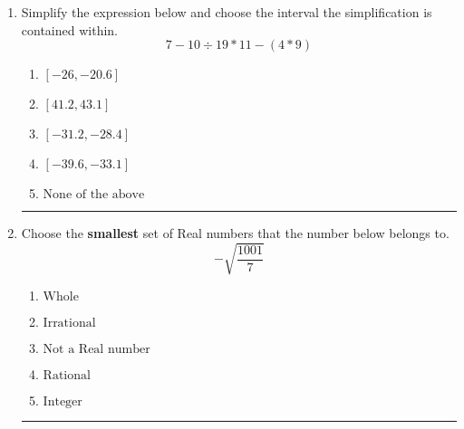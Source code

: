 \documentclass[14pt]{extbook}
\newcommand{\litem}[1]{\item#1\hspace*{-1cm}\rule{\textwidth}{0.4pt}}
\begin{document}
\begin{enumerate}
{\begin{enumerate}[label=\Alph*.]
\end{enumerate} }
\litem{
Simplify the expression below and choose the interval the simplification is contained within.\[ 7 - 10 \div 19 * 11 - (4 * 9) \]\begin{enumerate}[label=\Alph*.]
\item \( [-26, -20.6] \)
\item \( [41.2, 43.1] \)
\item \( [-31.2, -28.4] \)
\item \( [-39.6, -33.1] \)
\item \( \text{None of the above} \)

\end{enumerate} }
\litem{
Choose the \textbf{smallest} set of Real numbers that the number below belongs to.\[ -\sqrt{\frac{1001}{7}} \]\begin{enumerate}[label=\Alph*.]
\item \( \text{Whole} \)
\item \( \text{Irrational} \)
\item \( \text{Not a Real number} \)
\item \( \text{Rational} \)
\item \( \text{Integer} \)

\end{enumerate} }
\end{enumerate}
\end{document}

